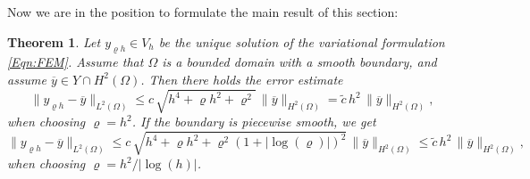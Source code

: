 \documentclass{article}
\newtheorem{theorem}{Theorem}
\numberwithin{equation}{section}
\begin{document}
\noindent
Now we are in the position to formulate the main result of this section:

\begin{theorem}\label{Theorem:DiscretizationErrorEstimate} 
  Let $y_{\varrho h} \in V_h$ be the unique solution of the variational
  formulation \eqref{Eqn:FEM}. Assume that $\Omega$ is a bounded domain
  with a smooth boundary, and assume $\overline{y} \in Y \cap H^2(\Omega)$.
  Then there holds the error estimate
  \begin{equation}\label{Eqn:Error regular}
    \| y_{\varrho h} - \overline{y} \|_{L^2(\Omega)} \leq
    c \, \sqrt{h^4 + \varrho h^2 + \varrho^2} \,
    \| \overline{y} \|_{H^2(\Omega)} =
    \widetilde{c} \, h^2 \, \| \overline{y} \|_{H^2(\Omega)},
  \end{equation}
  when choosing $\varrho = h^2$. If the boundary is piecewise smooth, we get 
  \begin{equation*}
    \| y_{\varrho h} - \overline{y} \|_{L^2(\Omega)} \leq
    c \, \sqrt{h^4 + \varrho h^2 + \varrho^2(1+|\log(\varrho)|)^2} \,
    \| \overline{y} \|_{H^2(\Omega)} \leq \widetilde{c} \, h^2 \,
    \|\overline{y}\|_{H^2(\Omega)},
  \end{equation*}
  when choosing $\varrho = h^2/|\log(h)|$.
\end{theorem}
\end{document}
